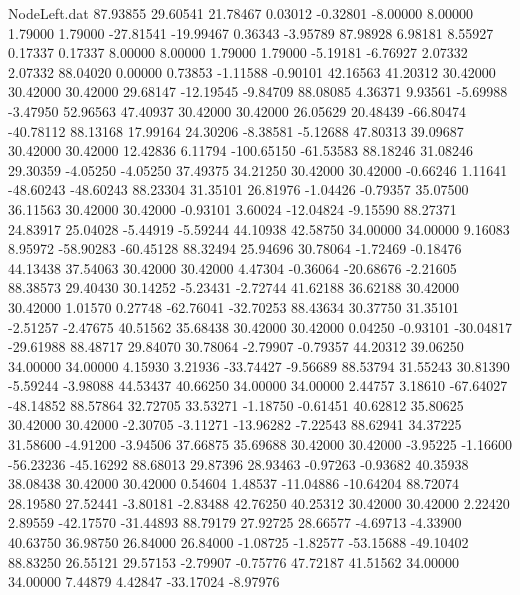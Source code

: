 \begin{filecontents}{NodeLeft.dat}
  87.93855   29.60541   21.78467     0.03012   -0.32801   -8.00000    8.00000    1.79000    1.79000  -27.81541  -19.99467    0.36343   -3.95789
  87.98928    6.98181    8.55927     0.17337    0.17337    8.00000    8.00000    1.79000    1.79000   -5.19181   -6.76927    2.07332    2.07332
  88.04020    0.00000    0.73853    -1.11588   -0.90101   42.16563   41.20312   30.42000   30.42000   30.42000   29.68147  -12.19545   -9.84709
  88.08085    4.36371    9.93561    -5.69988   -3.47950   52.96563   47.40937   30.42000   30.42000   26.05629   20.48439  -66.80474  -40.78112
  88.13168   17.99164   24.30206    -8.38581   -5.12688   47.80313   39.09687   30.42000   30.42000   12.42836    6.11794 -100.65150  -61.53583
  88.18246   31.08246   29.30359    -4.05250   -4.05250   37.49375   34.21250   30.42000   30.42000   -0.66246    1.11641  -48.60243  -48.60243
  88.23304   31.35101   26.81976    -1.04426   -0.79357   35.07500   36.11563   30.42000   30.42000   -0.93101    3.60024  -12.04824   -9.15590
  88.27371   24.83917   25.04028    -5.44919   -5.59244   44.10938   42.58750   34.00000   34.00000    9.16083    8.95972  -58.90283  -60.45128
  88.32494   25.94696   30.78064    -1.72469   -0.18476   44.13438   37.54063   30.42000   30.42000    4.47304   -0.36064  -20.68676   -2.21605
  88.38573   29.40430   30.14252    -5.23431   -2.72744   41.62188   36.62188   30.42000   30.42000    1.01570    0.27748  -62.76041  -32.70253
  88.43634   30.37750   31.35101    -2.51257   -2.47675   40.51562   35.68438   30.42000   30.42000    0.04250   -0.93101  -30.04817  -29.61988
  88.48717   29.84070   30.78064    -2.79907   -0.79357   44.20312   39.06250   34.00000   34.00000    4.15930    3.21936  -33.74427   -9.56689
  88.53794   31.55243   30.81390    -5.59244   -3.98088   44.53437   40.66250   34.00000   34.00000    2.44757    3.18610  -67.64027  -48.14852
  88.57864   32.72705   33.53271    -1.18750   -0.61451   40.62812   35.80625   30.42000   30.42000   -2.30705   -3.11271  -13.96282   -7.22543
  88.62941   34.37225   31.58600    -4.91200   -3.94506   37.66875   35.69688   30.42000   30.42000   -3.95225   -1.16600  -56.23236  -45.16292
  88.68013   29.87396   28.93463    -0.97263   -0.93682   40.35938   38.08438   30.42000   30.42000    0.54604    1.48537  -11.04886  -10.64204
  88.72074   28.19580   27.52441    -3.80181   -2.83488   42.76250   40.25312   30.42000   30.42000    2.22420    2.89559  -42.17570  -31.44893
  88.79179   27.92725   28.66577    -4.69713   -4.33900   40.63750   36.98750   26.84000   26.84000   -1.08725   -1.82577  -53.15688  -49.10402
  88.83250   26.55121   29.57153    -2.79907   -0.75776   47.72187   41.51562   34.00000   34.00000    7.44879    4.42847  -33.17024   -8.97976

\end{filecontents}

